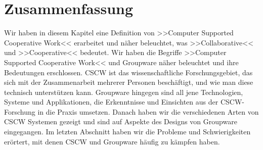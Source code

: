 \section*{Zusammenfassung}
Wir haben in diesem Kapitel eine Definition von >>Computer Supported Cooperative Work<< erarbeitet und näher beleuchtet, was >>Collaborative<< und >>Cooperative<< bedeutet. Wir haben die Begriffe >>Computer Supported Cooperative Work<< und Groupware näher beleuchtet und ihre Bedeutungen erschlossen. CSCW ist das wissenschaftliche Forschungsgebiet, das sich mit der Zusammenarbeit mehrerer Personen beschäftigt, und wie man diese technisch unterstützen kann. Groupware hingegen sind all jene Technologien, Systeme und Applikationen, die Erkenntnisse und Einsichten aus der CSCW-Forschung in die Praxis umsetzen. Danach haben wir die verschiedenen Arten von CSCW Systemen gezeigt und sind auf Aspekte des Designs von Groupware eingegangen. Im letzten Abschnitt haben wir die Probleme und Schwierigkeiten erörtert, mit denen CSCW und Groupware häufig zu kämpfen haben.
